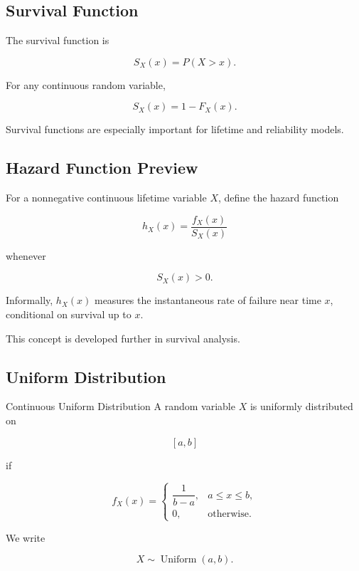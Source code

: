 \subsection{Survival Function}
\label{subsec:continuous-survival-function}

The survival function is

\[
\boxed{
S_X(x)
=
P(X>x).
}
\]

For any continuous random variable,

\[
\boxed{
S_X(x)
=
1-F_X(x).
}
\]

Survival functions are especially important for lifetime and reliability
models.

\subsection{Hazard Function Preview}
\label{subsec:hazard-function-preview}

For a nonnegative continuous lifetime variable \(X\), define the hazard
function

\[
\boxed{
h_X(x)
=
\frac{f_X(x)}{S_X(x)}
}
\]

whenever

\[
S_X(x)>0.
\]

Informally, \(h_X(x)\) measures the instantaneous rate of failure near
time \(x\), conditional on survival up to \(x\).

This concept is developed further in survival analysis.

\subsection{Uniform Distribution}
\label{subsec:continuous-uniform-distribution}

\begin{definitionbox}{Continuous Uniform Distribution}
A random variable \(X\) is uniformly distributed on

\[
[a,b]
\]

if

\[
\boxed{
f_X(x)
=
\begin{cases}
\dfrac{1}{b-a},&a\leq x\leq b,\\[2mm]
0,&\text{otherwise}.
\end{cases}
}
\]

We write

\[
\boxed{
X\sim\operatorname{Uniform}(a,b).
}
\]
\end{definitionbox}

